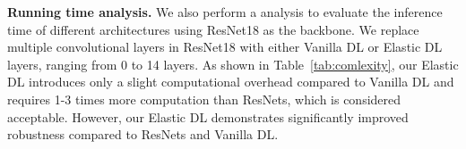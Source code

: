 \textbf{Running time analysis.} We also perform a 
analysis to evaluate the inference time of different architectures using ResNet18 as the backbone. We replace multiple convolutional layers in ResNet18 with either Vanilla DL or Elastic DL layers, ranging from 0 to 14 layers. As shown in Table~\ref{tab:comlexity}, our Elastic DL introduces only a slight computational overhead compared to Vanilla DL and requires 1-3 times more computation than ResNets, which is considered acceptable. However, our Elastic DL demonstrates significantly improved robustness compared to ResNets and Vanilla DL.


\begin{table}[h!]
\centering
\vspace{-0.2in}
\caption{ Running time (ms) analysis.
}
\label{tab:comlexity}
\vspace{0.1in}
\begin{center}
\begin{sc}

\end{sc}
\end{center}
\vspace{-0.2in}
\end{table}




